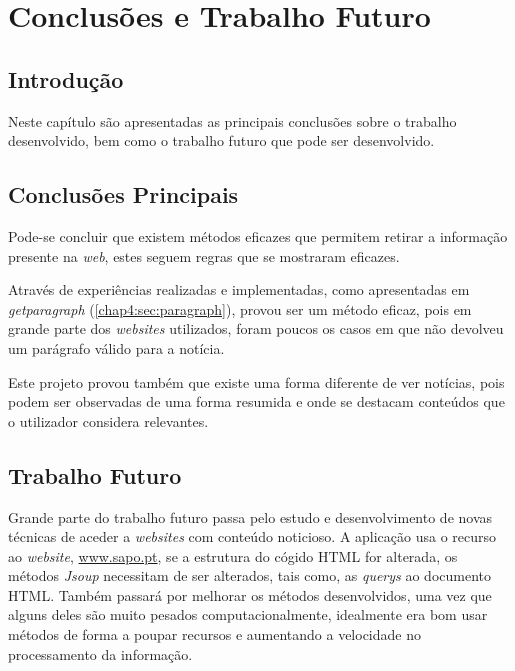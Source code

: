 \chapter{Conclusões e Trabalho Futuro}
\label{chap:conc-trab-futuro}


\section{Introdução}
Neste capítulo são apresentadas as principais conclusões sobre o trabalho desenvolvido, bem como o trabalho futuro que pode ser desenvolvido.


\section{Conclusões Principais}
\label{sec:conc-princ}
Pode-se concluir que existem métodos eficazes que permitem retirar a informação presente na \emph{web}, estes seguem regras que se mostraram eficazes.\par 
Através de experiências realizadas e implementadas, como apresentadas em \emph{getparagraph} (\ref{chap4:sec:paragraph}), provou ser um método eficaz, pois em grande parte dos \emph{websites} utilizados, foram poucos os casos em que não devolveu um parágrafo válido para a notícia.\par
Este projeto provou também que existe uma forma diferente de ver notícias, pois podem ser observadas de uma forma resumida e onde se destacam conteúdos que o utilizador considera relevantes.
 



\section{Trabalho Futuro}
\label{sec:trab-futuro}
Grande parte do trabalho futuro passa pelo estudo e desenvolvimento de novas técnicas de aceder a \emph{websites} com conteúdo noticioso. A aplicação usa o recurso ao \emph{website}, \url{www.sapo.pt}, se a  estrutura do cógido \ac{HTML} for alterada, os métodos \emph{Jsoup} necessitam de ser alterados, tais como, as \emph{querys} ao documento \ac{HTML}.
Também passará por melhorar os métodos desenvolvidos, uma vez que alguns deles são muito pesados computacionalmente, idealmente era bom usar métodos de forma a poupar recursos e aumentando a velocidade no processamento da informação.


